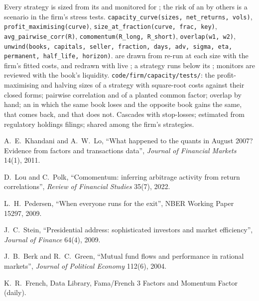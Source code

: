 \begin{build}
 Every strategy is sized from its  and monitored for ; the risk of an  by others is a scenario in the firm's stress
tests.
 \texttt{capacity\_curve(sizes, net\_returns, vols)}, \texttt{profit\_maximising(curve)}, \texttt{size\_at\_fraction(curve, frac, key)},
\texttt{avg\_pairwise\_corr(R)}, \texttt{comomentum(R\_long, R\_short)}, \texttt{overlap(w1, w2)}, \texttt{unwind(books, capitals, seller, fraction, days, adv,
sigma, eta, permanent, half\_life, horizon)}.
  are drawn from  re-run at each size with the firm's fitted costs, and redrawn with live ; a
strategy runs below its ;  monitors are reviewed with the book's liquidity.
 \texttt{code/firm/capacity/tests/}: the profit-maximising and halving sizes of a strategy with square-root costs against their closed
forms; pairwise correlation and  of a planted common factor; overlap by hand; an  in which the same book loses and the opposite book gains the
same,  that comes back, and  that does not.
 Cascades with stop-losses;  estimated from regulatory holdings filings;  shared among the firm's strategies.
\end{build}

\begin{omsources}
\item A.~E.~Khandani and A.~W.~Lo, ``What happened to the quants in August 2007? Evidence from factors and transactions data'', \emph{Journal of Financial Markets}
14(1), 2011.
\item D.~Lou and C.~Polk, ``Comomentum: inferring arbitrage activity from return correlations'', \emph{Review of Financial Studies} 35(7), 2022.
\item L.~H.~Pedersen, ``When everyone runs for the exit'', NBER Working Paper 15297, 2009.
\item J.~C.~Stein, ``Presidential address: sophisticated investors and market efficiency'', \emph{Journal of Finance} 64(4), 2009.
\item J.~B.~Berk and R.~C.~Green, ``Mutual fund flows and performance in rational markets'', \emph{Journal of Political Economy} 112(6), 2004.
\item K.~R.~French, Data Library, Fama/French 3 Factors and Momentum Factor (daily).
\end{omsources}


